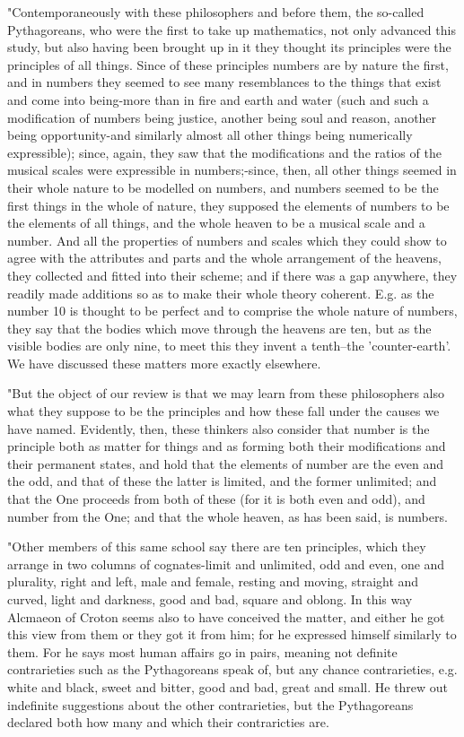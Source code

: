 "Contemporaneously with these philosophers and before them, the so-called
Pythagoreans, who were the first to take up mathematics, not only
advanced this study, but also having been brought up in it they thought
its principles were the principles of all things. Since of these principles
numbers are by nature the first, and in numbers they seemed to see
many resemblances to the things that exist and come into being-more
than in fire and earth and water (such and such a modification of
numbers being justice, another being soul and reason, another being
opportunity-and similarly almost all other things being numerically
expressible); since, again, they saw that the modifications and the
ratios of the musical scales were expressible in numbers;-since, then,
all other things seemed in their whole nature to be modelled on numbers,
and numbers seemed to be the first things in the whole of nature,
they supposed the elements of numbers to be the elements of all things,
and the whole heaven to be a musical scale and a number. And all the
properties of numbers and scales which they could show to agree with
the attributes and parts and the whole arrangement of the heavens,
they collected and fitted into their scheme; and if there was a gap
anywhere, they readily made additions so as to make their whole theory
coherent. E.g. as the number 10 is thought to be perfect and to comprise
the whole nature of numbers, they say that the bodies which move through
the heavens are ten, but as the visible bodies are only nine, to meet
this they invent a tenth--the 'counter-earth'. We have discussed these
matters more exactly elsewhere. 

"But the object of our review is that we may learn from these philosophers
also what they suppose to be the principles and how these fall under
the causes we have named. Evidently, then, these thinkers also consider
that number is the principle both as matter for things and as forming
both their modifications and their permanent states, and hold that
the elements of number are the even and the odd, and that of these
the latter is limited, and the former unlimited; and that the One
proceeds from both of these (for it is both even and odd), and number
from the One; and that the whole heaven, as has been said, is numbers.

"Other members of this same school say there are ten principles, which
they arrange in two columns of cognates-limit and unlimited, odd and
even, one and plurality, right and left, male and female, resting
and moving, straight and curved, light and darkness, good and bad,
square and oblong. In this way Alcmaeon of Croton seems also to have
conceived the matter, and either he got this view from them or they
got it from him; for he expressed himself similarly to them. For he
says most human affairs go in pairs, meaning not definite contrarieties
such as the Pythagoreans speak of, but any chance contrarieties, e.g.
white and black, sweet and bitter, good and bad, great and small.
He threw out indefinite suggestions about the other contrarieties,
but the Pythagoreans declared both how many and which their contraricties
are. 

